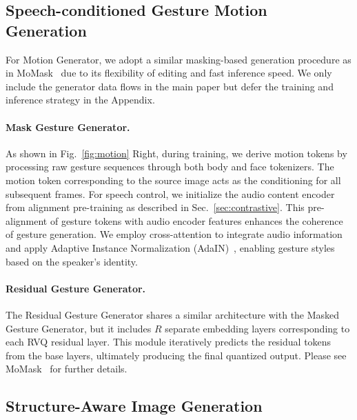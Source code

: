 \vspace{-0.1cm}

\subsection{Speech-conditioned Gesture Motion Generation}
\label{sec:gesture_generation}

For Motion Generator, we adopt a similar masking-based generation procedure as in MoMask~\cite{moMask} due to its flexibility of editing and fast inference speed. We only include the generator data flows in the main paper but defer the training and inference strategy in the Appendix.


\vspace{-0.2cm}
\paragraph{Mask Gesture Generator.}
\label{subsec:maskgesture}

As shown in Fig.~\ref{fig:motion} Right, during training, we derive motion tokens by processing raw gesture sequences through both body and face tokenizers. The motion token corresponding to the source image acts as the conditioning for all subsequent frames. 
For speech control, we initialize the audio content encoder from alignment pre-training as described in Sec.~\ref{sec:contrastive}. This pre-alignment of gesture tokens with audio encoder features enhances the coherence of gesture generation. We employ cross-attention to integrate audio information and apply Adaptive Instance Normalization (AdaIN)~\cite{adain}, enabling gesture styles based on the speaker's identity.

\vspace{-0.2cm}
\paragraph{Residual Gesture Generator.}
The Residual Gesture Generator shares a similar architecture with the Masked Gesture Generator, but it includes \( R \) separate embedding layers corresponding to each RVQ residual layer. This module iteratively predicts the residual tokens from the base layers, ultimately producing the final quantized output. Please see MoMask~\cite{moMask} for further details.



\vspace{-0.2cm}
\subsection{Structure-Aware Image Generation}
\label{sec:image-refine}

